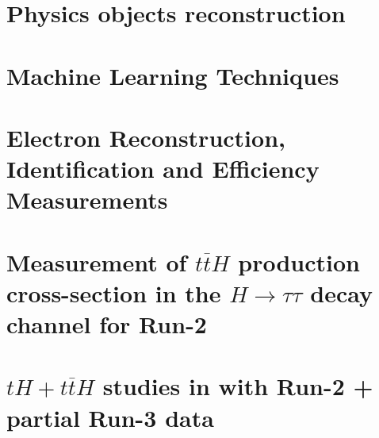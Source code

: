 \documentclass[11pt,twoside]{book}
\newcommand*{\ttH}{\ensuremath{t\overline{t}H}\xspace}
\newcommand*{\thtth}{\ensuremath{tH+t\overline{t}H}\xspace}
\begin{document}
\chapter{Physics objects reconstruction}
\label{chap:object_rec}


\chapter{Machine Learning Techniques}
\label{chap:machine_learning}


\chapter{Electron Reconstruction, Identification and Efficiency Measurements}
\label{chap:electrons}


\chapter{Measurement of \ttH production cross-section in the $H \to \tau \tau$ decay channel for Run-2}
\label{chap:htautau}



\chapter{\thtth studies in \htautau with Run-2 + partial Run-3 data}
\label{chap:run3_tth}


\end{document}
